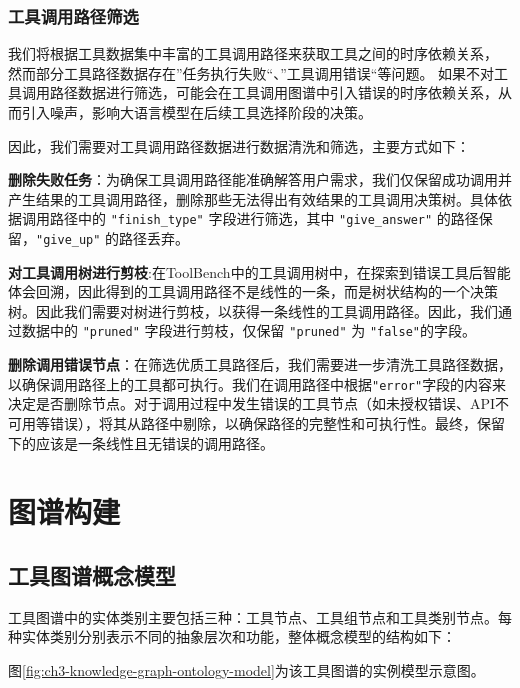 \subsubsection{工具调用路径筛选}

我们将根据工具数据集中丰富的工具调用路径来获取工具之间的时序依赖关系，
然而部分工具路径数据存在”任务执行失败“、”工具调用错误“等问题。
如果不对工具调用路径数据进行筛选，可能会在工具调用图谱中引入错误的时序依赖关系，从而引入噪声，影响大语言模型在后续工具选择阶段的决策。

因此，我们需要对工具调用路径数据进行数据清洗和筛选，主要方式如下：

\textbf{删除失败任务}：为确保工具调用路径能准确解答用户需求，我们仅保留成功调用并产生结果的工具调用路径，删除那些无法得出有效结果的工具调用决策树。具体依据调用路径中的 \texttt{"finish\_type"} 字段进行筛选，其中 \texttt{"give\_answer"} 的路径保留，\texttt{"give\_up"} 的路径丢弃。

\textbf{对工具调用树进行剪枝}:在ToolBench中的工具调用树中，在探索到错误工具后智能体会回溯，因此得到的工具调用路径不是线性的一条，而是树状结构的一个决策树。因此我们需要对树进行剪枝，以获得一条线性的工具调用路径。因此，我们通过数据中的 \texttt{"pruned"} 字段进行剪枝，仅保留 \texttt{"pruned"} 为 \texttt{"false"}的字段。

\textbf{删除调用错误节点}：在筛选优质工具路径后，我们需要进一步清洗工具路径数据，以确保调用路径上的工具都可执行。我们在调用路径中根据\texttt{"error"}字段的内容来决定是否删除节点。对于调用过程中发生错误的工具节点（如未授权错误、API不可用等错误），将其从路径中剔除，以确保路径的完整性和可执行性。最终，保留下的应该是一条线性且无错误的调用路径。


\section{图谱构建}

\subsection{工具图谱概念模型}

工具图谱中的实体类别主要包括三种：工具节点、工具组节点和工具类别节点。每种实体类别分别表示不同的抽象层次和功能，整体概念模型的结构如下：

图\ref{fig:ch3-knowledge-graph-ontology-model}为该工具图谱的实例模型示意图。

